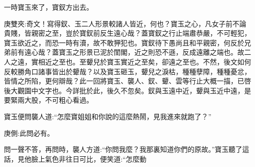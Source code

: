 \begin{parag}
    一時寶玉來了，寶釵方出去。\begin{note}庚雙夾:奇文！寫得釵、玉二人形景較諸人皆近，何也？寶玉之心，凡女子前不論貴賤，皆親密之至，豈於寶釵前反生遠心哉？蓋寶釵之行止端肅恭嚴，不可輕犯，寶玉欲近之，而恐一時有瀆，故不敢狎犯也。寶釵待下愚尚且和平親密，何反於兄弟前有遠心哉？蓋寶玉之形景已泥於閨閣，近之則恐不遜，反成遠離之端也。故二人之遠，實相近之至也。至顰兒於寶玉實近之至矣，卻遠之至也。不然，後文如何反較勝角口諸事皆出於顰哉？以及寶玉砸玉，顰兒之淚枯，種種孽障，種種憂忿，皆情之所陷，更何辯哉？此一回將寶玉、襲人、釵、顰、雲等行止大概一描，已啓後大觀園中文字也。今詳批於此，後久不忽矣。釵與玉遠中近，顰與玉近中遠，是要緊兩大股，不可粗心看過。\end{note}寶玉便問襲人道:“怎麼寶姐姐和你說的這麼熱鬧，見我進來就跑了？”\begin{note}庚側:此問必有。\end{note}問一聲不答，再問時，襲人方道:“你問我麼？我那裏知道你們的原故。”寶玉聽了這話，見他臉上氣色非往日可比，便笑道:“怎麼動
\end{parag}

